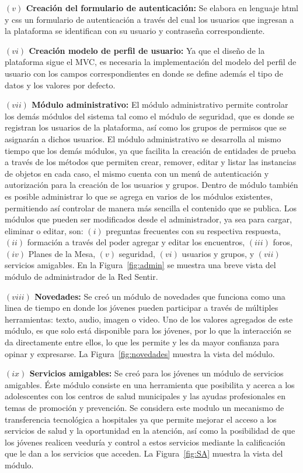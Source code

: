 \documentclass[journal,transmag]{IEEEtran}
\begin{document}
\textbf{$(v)$ Creación del formulario de autenticación:} Se elabora en lenguaje html y css un formulario de autenticación a través del cual los usuarios que ingresan a la plataforma se identifican con su usuario y contraseña correspondiente.

\textbf{$(vi)$ Creación modelo de perfil de usuario:} Ya que el diseño de la plataforma sigue el MVC, es necesaria la implementación del modelo del perfil de usuario con los campos correspondientes en donde se define además el tipo de datos y los valores por defecto.

\textbf{$(vii)$ Módulo administrativo:} El módulo administrativo permite controlar los demás módulos del sistema tal como el módulo de seguridad, que es donde se registran los usuarios de la plataforma, así como los grupos de permisos que se asignarán a dichos usuarios. El módulo administrativo se desarrolla al mismo tiempo que los demás módulos, ya que facilita la creación de entidades de prueba a través de los métodos que permiten crear, remover, editar y listar  las instancias de objetos en cada caso, el mismo cuenta con un menú de autenticación y autorización para la creación de los usuarios y grupos. Dentro de módulo también es posible administrar lo que se agrega en varios de los módulos existentes, permitiendo así controlar de manera más sencilla el contenido que se publica. Los módulos que pueden ser modificados desde el administrador, ya sea para cargar, eliminar o editar, son: $(i)$ preguntas frecuentes con su respectiva respuesta, $(ii)$ formación a través del poder agregar y editar los encuentros, $(iii)$ foros, $(iv)$ Planes de la Mesa, $(v)$ seguridad, $(vi)$ usuarios y grupos, y $(vii)$ servicios amigables. En la Figura~\ref{fig:admin} se muestra una breve vista del módulo de administrador de la Red Sentir.

\textbf{$(viii)$ Novedades:} Se creó un módulo de novedades que funciona como una linea de tiempo en donde los jóvenes pueden participar a través de múltiples herramientas: texto,  audio, imagen o video. Uno de los valores agregados de este módulo, es que solo está disponible para los jóvenes, por lo que la interacción se da directamente entre ellos, lo que les permite y les da mayor confianza para opinar y expresarse. La Figura~\ref{fig:novedades} muestra la vista del módulo.

\textbf{$(ix)$ Servicios amigables:} Se creó para los jóvenes un módulo de servicios amigables. Éste módulo consiste en una herramienta que posibilita y acerca a los adolescentes con los centros de salud municipales y las ayudas profesionales en temas de promoción y prevención. Se considera este modulo un mecanismo de transferencia tecnológica a hospitales ya que permite mejorar el acceso a los servicios de salud y la oportunidad en la atención, así como la posibilidad de que los jóvenes realicen veeduría y control a estos servicios mediante la calificación que le dan a los servicios que acceden. La Figura~\ref{fig:SA} muestra la vista del módulo.
\end{document}
